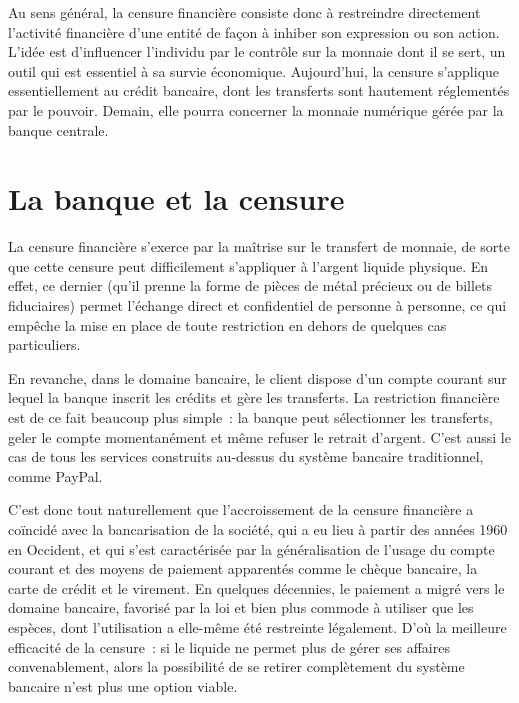 Au sens général, la censure financière consiste donc à restreindre directement l'activité financière d'une entité de façon à inhiber son expression ou son action. L'idée est d'influencer l'individu par le contrôle sur la monnaie dont il se sert, un outil qui est essentiel à sa survie économique. Aujourd'hui, la censure s'applique essentiellement au crédit bancaire, dont les transferts sont hautement réglementés par le pouvoir. Demain, elle pourra concerner la monnaie numérique gérée par la banque centrale.

\section*{La banque et la censure}

La censure financière s'exerce par la maîtrise sur le transfert de monnaie, de sorte que cette censure peut difficilement s'appliquer à l'argent liquide physique. En effet, ce dernier (qu'il prenne la forme de pièces de métal précieux ou de billets fiduciaires) permet l'échange direct et confidentiel de personne à personne, ce qui empêche la mise en place de toute restriction en dehors de quelques cas particuliers.

En revanche, dans le domaine bancaire, le client dispose d'un compte courant sur lequel la banque inscrit les crédits et gère les transferts. La restriction financière est de ce fait beaucoup plus simple~: la banque peut sélectionner les transferts, geler le compte momentanément et même refuser le retrait d'argent. C'est aussi le cas de tous les services construits au-dessus du système bancaire traditionnel, comme PayPal.

C'est donc tout naturellement que l'accroissement de la censure financière a coïncidé avec la bancarisation de la société, qui a eu lieu à partir des années 1960 en Occident, et qui s'est caractérisée par la généralisation de l'usage du compte courant et des moyens de paiement apparentés comme le chèque bancaire, la carte de crédit et le virement. En quelques décennies, le paiement a migré vers le domaine bancaire, favorisé par la loi et bien plus commode à utiliser que les espèces, dont l'utilisation a elle-même été restreinte légalement. D'où la meilleure efficacité de la censure~: si le liquide ne permet plus de gérer ses affaires convenablement, alors la possibilité de se retirer complètement du système bancaire n'est plus une option viable.


